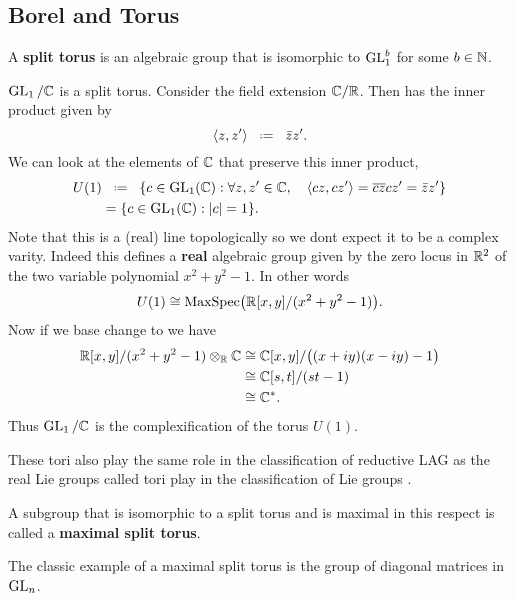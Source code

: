     \subsection{Borel and Torus}\label{borel_torus}    
    A \textbf{split torus} is an algebraic group that is isomorphic to \(\operatorname{GL}_1^b\) for some \(b\in\N\).

    \begin{example}
        \(\GL_1 /\C\) is a split torus. Consider the field extension \(\C/\R\). Then \C has the inner product given by 
        \[\inner{z, z'} \defeq \bar{z}z'.\]
        We can look at the elements of \(\C\) that preserve this inner product, 
        \begin{align*}
            U(1)&\defeq \{c\in \GL_1(\C) : \forall z,z'\in \C , \quad \inner{cz, cz'} = \overline{cz}cz' = \bar{z}z'\} \\
             &= \{c\in \GL_1(\C) : |c| = 1\}.
        \end{align*}
        Note that this is a (real) line topologically so we dont expect it to be a complex varity. Indeed this defines a \textbf{real} algebraic group given by the zero locus in \(\R^2\) of the two variable polynomial \(x^2 + y^2 - 1\). In other words
        \[ U(1) \cong \mathrm{MaxSpec}\big(\R[x,y]/(x^2 + y^2 - 1)\big) .\]
        Now if we base change to \C we have 
        \begin{align*}
            \R[x,y]/(x^2 + y^2 - 1) \tensor_\R \C &\cong \C[x,y]/\big((x+iy)(x-iy) -1 \big)\\
             &\cong \C[s,t]/(st -1) \\
             &\cong \C^\ast.
        \end{align*}
        Thus \(\GL_1 / \C\) is the complexification of the torus \(U(1)\).
    \end{example}
    
    \begin{remark}
        These tori also play the same role in the classification of reductive LAG as the real Lie groups called tori play in the classification of Lie groups \cite[Part III]{hallLieGroupsLie2015}.
    \end{remark}
    
    A subgroup that is isomorphic to a split torus and is maximal in this respect is called a \textbf{maximal split torus}. 
     \begin{example}
        The classic example of a maximal split torus is the group of diagonal matrices in \(\operatorname{GL}_n\).
     \end{example}

